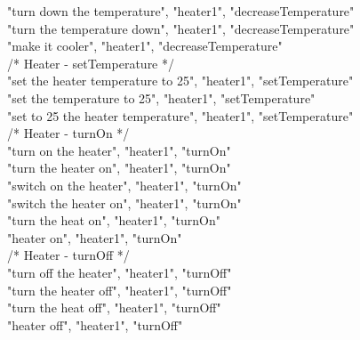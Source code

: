 \documentclass[twoside]{supsistudent}
\begin{document}
\begin{appendices}
        "turn down the temperature", "heater1", "decreaseTemperature"\\
        "turn the temperature down", "heater1", "decreaseTemperature"\\
        "make it cooler", "heater1", "decreaseTemperature"\\
        /*
        Heater - setTemperature
         */\\
        "set the heater temperature to 25", "heater1", "setTemperature"\\
        "set the temperature to 25", "heater1", "setTemperature"\\
        "set to 25 the heater temperature", "heater1", "setTemperature"\\
        /*
        Heater - turnOn
         */\\
        "turn on the heater", "heater1", "turnOn"\\
        "turn the heater on", "heater1", "turnOn"\\
        "switch on the heater", "heater1", "turnOn"\\
        "switch the heater on", "heater1", "turnOn"\\
        "turn the heat on", "heater1", "turnOn"\\
        "heater on", "heater1", "turnOn"\\
        /*
        Heater - turnOff
         */\\
        "turn off the heater", "heater1", "turnOff"\\
        "turn the heater off", "heater1", "turnOff"\\
        "turn the heat off", "heater1", "turnOff"\\
        "heater off", "heater1", "turnOff"\\
\end{appendices}
\end{document}
